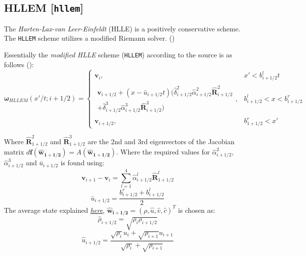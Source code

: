 \documentclass[a4paper, 12pt]{article}
\begin{document}
\subsection{HLLEM [\texttt{hllem}]} \label{hllem}
The \textit{Harten-Lax-van Leer-Einfeldt} (HLLE) is a positively conservative scheme. The \verb|HLLEM| scheme utilizes a modified Riemann solver. (\cite{hllem}) \\\par
Essentially the \textit{modified HLLE} scheme (\verb|HLLEM|) according to the source is as follows (\cite{hllem}):
\begin{equation}
    \mathbf{\omega}_{HLLEM}(x'/t; i+1/2) = 
    \begin{cases}
        \textbf{v}_i,& x' < b_{i+1/2}^lt \\
        \begin{split}
        \textbf{v}_{i+1/2}+(x-\bar u_{i+1/2}t)(\hat\delta^2_{i+1/2}\hat\alpha^2_{i+1/2}\mathbf{\hat R}^2_{i+1/2}\\+\hat\delta^3_{i+1/2}\hat\alpha^3_{i+1/2}\mathbf{\hat R}^3_{i+1/2})
        \end{split}
        ,& b^l_{i+1/2}<x<b^r_{i+1/2}\\
        \textbf{v}_{i+1/2},& b^r_{1+1/2}<x'
    \end{cases}
\end{equation} \par
\label{avgs}Where $\mathbf{\hat R}^2_{1+1/2}$ and $\mathbf{\hat R}^3_{1+1/2}$ are the 2nd and 3rd eigenvectors of the Jacobian matrix $d\textbf{f}(\mathbf{\hat w_{1+1/2}})=A(\mathbf{\hat w_{1+1/2}})$. Where the required values for $\hat\alpha^2_{i+1/2}$, $\hat\alpha^3_{i+1/2}$ and $\bar u_{i+1/2}$ is found using:
\begin{equation}
    \textbf{v}_{i+1}-\textbf{v}_i=\sum^4_{l=1}\hat\alpha^l_{i+1/2}\mathbf{\hat R}^l_{1+1/2}
\end{equation}
\begin{equation}
    \bar u_{i+1/2}=\dfrac{b^r_{i+1/2}+b^l_{i+1/2}}{2}
\end{equation}
The average state explained \hyperref[avgs]{\textit{here}}, $\mathbf{\hat w_{i+1/2}} = (\hat\rho,\hat u, \hat v, \hat c)^T$ is chosen as:
\begin{equation}
    \hat\rho_{i+1/2}=\sqrt{\rho_i\rho_{i+1/2}}
\end{equation}
\begin{equation}
    \hat u_{i+1/2}=\dfrac{\sqrt{\rho_i}u_i+\sqrt{\rho_{i+1}}u_{i+1}}{\sqrt{\rho_i}+\sqrt{\rho_{i+1}}}
\end{equation}
\end{document}
